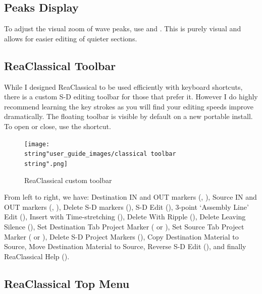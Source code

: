 \documentclass[10pt,american]{article}
\begin{document}
\subsection{Peaks Display}

To adjust the visual zoom of wave peaks, use \keys{\ctrl+\arrowkeyup} and
\keys{\ctrl+\arrowkeydown} . This is purely visual and allows for easier editing
of quieter sections.

\subsection{ReaClassical Toolbar}

While I designed ReaClassical to be used efficiently with keyboard shortcuts,
there is a custom S-D editing toolbar for those that prefer it. However I do
highly recommend learning the key strokes as you will find your editing speeds
improve dramatically. The floating toolbar is visible by default on a new
portable install. To open or close, use the  shortcut.
\begin{flushleft}
\begin{figure}[H]
\begin{centering}
\texttt{[image: \\string"user\_guide\_images/classical toolbar\\string".png]}
\par\end{centering} \caption{\label{classical-toolbar-1}ReaClassical custom
toolbar}
\end{figure}
\par\end{flushleft}

From left to right, we have: Destination IN and OUT markers (,
), Source IN and OUT markers (, ), Delete S-D markers
(\keys{\ctrl+\del}), S-D Edit (), 3-point `Assembly Line' Edit
(), Insert with Time-stretching (), Delete With Ripple
(\keys{\backspace}), Delete Leaving Silence (\keys{\ctrl+\backspace}), Set
Destination Tab Project Marker ( or ), Set
Source Tab Project Marker ( or ), Delete S-D
Project Markers (), Copy Destination Material to Source, Move
Destination Material to Source, Reverse S-D Edit (), and finally
ReaClassical Help ().

\subsection{ReaClassical Top Menu}
\end{document}
